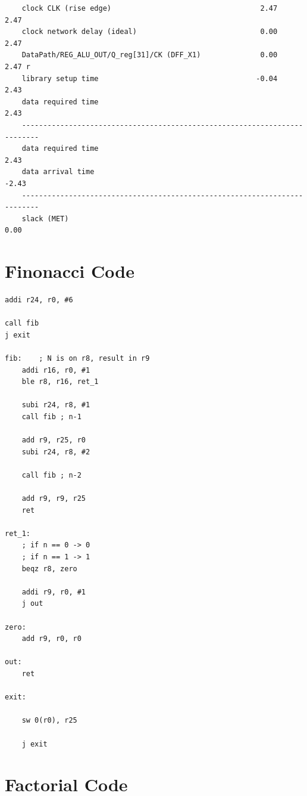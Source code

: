 \begin{lstlisting}
	clock CLK (rise edge)                                   2.47       2.47
	clock network delay (ideal)                             0.00       2.47
	DataPath/REG_ALU_OUT/Q_reg[31]/CK (DFF_X1)              0.00       2.47 r
	library setup time                                     -0.04       2.43
	data required time                                                 2.43
	--------------------------------------------------------------------------
	data required time                                                 2.43
	data arrival time                                                 -2.43
	--------------------------------------------------------------------------
	slack (MET)                                                        0.00
\end{lstlisting}

\newappendix\label{asm_examples}

\section{Finonacci Code}

\begin{lstlisting}[style=mips,caption={Fibonacci DLX Assembly example},label=asm_fibonacci]
addi r24, r0, #6

call fib
j exit

fib:    ; N is on r8, result in r9
    addi r16, r0, #1
    ble r8, r16, ret_1

    subi r24, r8, #1
    call fib ; n-1

    add r9, r25, r0   
    subi r24, r8, #2

    call fib ; n-2

    add r9, r9, r25       
    ret

ret_1:
    ; if n == 0 -> 0
    ; if n == 1 -> 1
    beqz r8, zero

    addi r9, r0, #1
    j out
    
zero:
    add r9, r0, r0

out:
    ret   

exit:

    sw 0(r0), r25

    j exit

\end{lstlisting}

\newpage
\section{Factorial Code}

